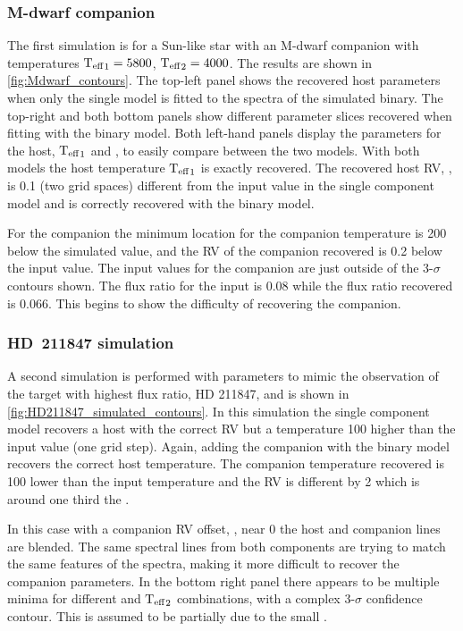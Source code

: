 \subsubsection*{M-dwarf companion}
The first simulation is for a Sun-like star with an M-dwarf companion with temperatures \({\textrm{T}_{\mathrm{eff}}}_{1} = 5800\)\K{}, \({\textrm{T}_{\mathrm{eff}}}_{2} = 4000\)\K{}.
The results are shown in \cref{fig:Mdwarf_contours}.
The top-left panel shows the recovered host parameters when only the single model is fitted to the spectra of the simulated binary.
The top-right and both bottom panels show different parameter slices recovered when fitting with the binary model.
Both left-hand panels display the parameters for the host, \({\textrm{T}_{\mathrm{eff}}}_{1}\) and \Rvone{}, to easily compare between the two models.
With both models the host temperature \({\textrm{T}_{\mathrm{eff}}}_{1}\) is exactly recovered.
The recovered host {RV}, \Rvone{}, is 0.1\kmps{} (two grid spaces) different from the input value in the single component model and is correctly recovered with the binary model.

For the companion the minimum \textchisquared{} location for the companion temperature is 200\K{} below the simulated value, and the {RV} of the companion recovered is 0.2\kmps{} below the input value.
The input values for the companion are just outside of the 3-\(\sigma\) contours shown.
The flux ratio for the input is 0.08 while the flux ratio recovered is 0.066.
This begins to show the difficulty of recovering the companion.

\subsubsection*{{HD~211847} simulation}
A second simulation is performed with parameters to mimic the observation of the target with highest flux ratio, {HD 211847}, and is shown in \cref{fig:HD211847_simulated_contours}.
In this simulation the single component model recovers a host with the correct {RV} but a temperature 100\K{} higher than the input value (one grid step).
Again, adding the companion with the binary model recovers the correct host temperature.
The companion temperature recovered is 100\K{} lower than the input temperature and the {RV} is different by 2\kmps{} which is around one third the {\fwhm}.

In this case with a companion {RV} offset, \Rvtwo{}, near 0\kmps{} the host and companion lines are blended.
The same spectral lines from both components are trying to match the same features of the spectra, making it more difficult to recover the companion parameters.
In the bottom right panel there appears to be multiple minima for different \Rvtwo{} and \({\textrm{T}_{\mathrm{eff}}}_{2}\) combinations, with a complex 3-\(\sigma\) confidence contour.
This is assumed to be partially due to the small \Rvtwo{}.

